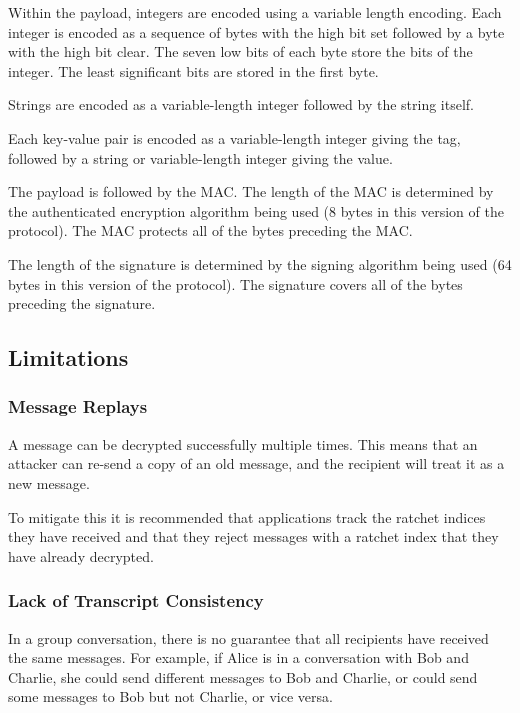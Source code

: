 \documentclass[10pt]{article}
\begin{document}
Within the payload, integers are encoded using a variable length
encoding. Each integer is encoded as a sequence of bytes with the high
bit set followed by a byte with the high bit clear. The seven low bits
of each byte store the bits of the integer. The least significant bits
are stored in the first byte.

Strings are encoded as a variable-length integer followed by the string
itself.

Each key-value pair is encoded as a variable-length integer giving the
tag, followed by a string or variable-length integer giving the value.

The payload is followed by the MAC. The length of the MAC is determined
by the authenticated encryption algorithm being used (8 bytes in this
version of the protocol). The MAC protects all of the bytes preceding
the MAC.

The length of the signature is determined by the signing algorithm being
used (64 bytes in this version of the protocol). The signature covers
all of the bytes preceding the signature.

\subsection{Limitations}\label{limitations}

\subsubsection{Message Replays}\label{message-replays}

A message can be decrypted successfully multiple times. This means that
an attacker can re-send a copy of an old message, and the recipient will
treat it as a new message.

To mitigate this it is recommended that applications track the ratchet
indices they have received and that they reject messages with a ratchet
index that they have already decrypted.

\subsubsection{Lack of Transcript
Consistency}\label{lack-of-transcript-consistency}

In a group conversation, there is no guarantee that all recipients have
received the same messages. For example, if Alice is in a conversation
with Bob and Charlie, she could send different messages to Bob and
Charlie, or could send some messages to Bob but not Charlie, or vice
versa.
\end{document}
